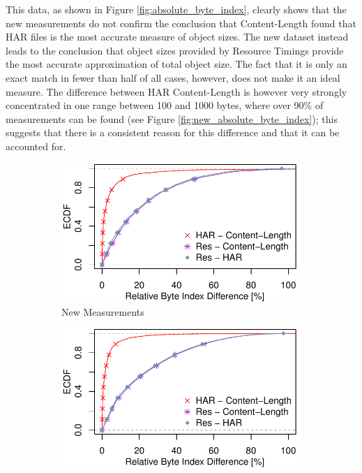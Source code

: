 This data, as shown in Figure \ref{fig:absolute_byte_index}, clearly shows that the new measurements do not confirm the conclusion that Content-Length found that HAR files is the most accurate measure of object sizes. The new dataset instead leads to the conclusion that object sizes provided by Resource Timings provide the most accurate approximation of total object size. The fact that it is only an exact match in fewer than half of all cases, however, does not make it an ideal measure. The difference between HAR Content-Length is however very strongly concentrated in one range between 100 and 1000 bytes, where over 90\% of measurements can be found (see Figure \ref{fig:new_absolute_byte_index}); this suggests that there is a consistent reason for this difference and that it can be accounted for. 

\begin{figure}
 \centering
 \begin{subfigure}{\linewidth}
		\includegraphics[width=\linewidth]{New_Plots/ecdf_rel_object_byte_index.pdf}
	\caption{New Measurements}
	\label{fig:new_relative_byte_index}
\end{subfigure}\par\medskip
 \begin{subfigure}{\linewidth}
		\includegraphics[width=\linewidth]{Firefox Plots/ecdf_rel_object_byte_index.pdf}

\end{subfigure}
\end{figure}
